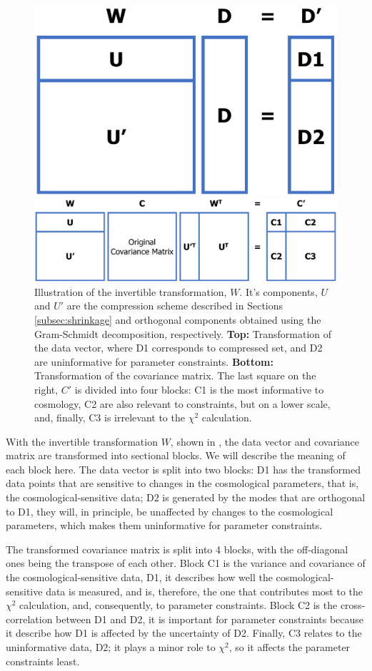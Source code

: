 \documentclass[twocolumn]{\docclass}
\begin{document}
	\begin{figure}[]
		\includegraphics[width=0.45\columnwidth]{Transformation_data.pdf}
		
		\bigskip
		
		\includegraphics[width=0.99\columnwidth]{Transformation_CM.pdf}
		\caption{Illustration of the invertible transformation, $W$. It's components, $U$ and $U'$ are the compression scheme described in Sections \ref{subsec:shrinkage} and orthogonal components obtained using the Gram-Schmidt decomposition, respectively. \textbf{Top:} Transformation of the data vector, where D1 corresponds to compressed set, and D2 are uninformative for parameter constraints. \textbf{Bottom:} Transformation of the covariance matrix. The last square on the right, $C'$ is divided into four blocks: C1 is the most informative to cosmology, C2 are also relevant to constraints, but on a lower scale, and, finally, C3 is irrelevant to the $\chi^2$ calculation. \label{fig:transformation}}
	\end{figure}
	
	With the invertible transformation $W$, shown in , the data vector and covariance matrix are transformed into sectional blocks. We will describe the meaning of each block here. The data vector is split into two blocks: D1 has the transformed data points that are sensitive to changes in the cosmological parameters, that is, the cosmological-sensitive data; D2 is generated by the modes that are orthogonal to D1, they will, in principle, be unaffected by changes to the cosmological parameters, which makes them uninformative for parameter constraints.
	
	The transformed covariance matrix is split into 4 blocks, with the off-diagonal ones being the transpose of each other. Block C1 is the variance and covariance of the cosmological-sensitive data, D1, it describes how well the cosmological-sensitive data is measured, and is, therefore, the one that contributes most to the $\chi^2$ calculation, and, consequently, to parameter constraints. Block C2 is the cross-correlation between D1 and D2, it is important for parameter constraints because it describe how D1 is affected by the uncertainty of D2.  Finally, C3 relates to the uninformative data, D2; it plays a minor role to $\chi^2$, so it affects the parameter constraints least.
	
\end{document}
